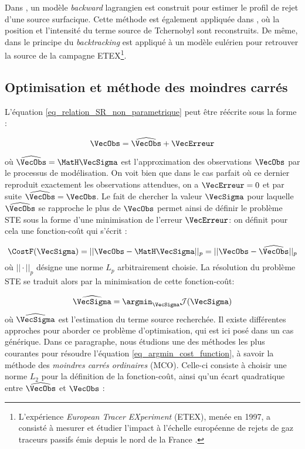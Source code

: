 Dans \cite{Flesch1995}, un modèle \textit{backward} lagrangien est construit pour estimer le profil de rejet d'une source surfacique.  Cette méthode est également appliquée dans \cite{Pudykiewicz1998}, où la position et l'intensité du terme source de Tchernobyl sont reconstruits. De même, dans \cite{Hourdin2006b} le principe du \textit{backtracking} est appliqué à un modèle eulérien pour retrouver la source de la campagne ETEX\footnote{L’expérience \textit{European Tracer EXperiment} (ETEX), menée en 1997,  a consisté à mesurer et étudier l'impact à l'échelle européenne de rejets de gaz traceurs passifs émis depuis le nord de la France \cite{Nodop1998}.}.\\
 
 \subsection{Optimisation et méthode des moindres carrés}
 \label{subsection_MCO}
 
 L'équation \eqref{eq_relation_SR_non_parametrique} peut être réécrite sous la forme : 
 
 \begin{equation}
 \VecObs = \widehat{\VecObs} + \VecErreur
 \label{eq_relation_SR_nonparam_simple}
 \end{equation}

où $\widehat{\VecObs} = \MatH \VecSigma$ est l'approximation des observations $\VecObs$ par le processus de modélisation. On voit bien que dans le cas parfait où ce dernier reproduit exactement les observations attendues, on a $\VecErreur = 0$ et par suite $\widehat{\VecObs} = \VecObs$. Le fait de chercher la valeur $\VecSigma$ pour laquelle $\widehat{\VecObs}$ se rapproche le plus de $\VecObs$ permet ainsi de définir le problème STE sous la forme d'une minimisation de l'erreur $\VecErreur$: on définit pour cela une fonction-coût qui s'écrit : 

\begin{equation}
\CostF(\VecSigma) = ||\VecObs - \MatH \VecSigma||_p = ||\VecObs- \widehat{\VecObs}||_p
\label{eq_cost_function_definition}
\end{equation}
où $||\cdot||_p$ désigne une norme $L_p$ arbitrairement choisie. La résolution du problème STE se traduit alors par la minimisation de cette fonction-coût:

\begin{equation}
\widehat{\VecSigma} = \argmin_\VecSigma \mathcal{J}(\VecSigma)
\label{eq_argmin_cost_function}
\end{equation}
où $\widehat{\VecSigma}$ est l'estimation du terme source recherchée. Il existe différentes approches  pour aborder ce problème d'optimisation, qui est ici posé dans un cas générique. Dans ce paragraphe, nous étudions une des méthodes les plus courantes pour résoudre l'équation \eqref{eq_argmin_cost_function}, à savoir la méthode des \textit{moindres carrés ordinaires} (MCO). Celle-ci consiste à choisir une norme $L_2$ pour la définition de la fonction-coût, ainsi qu'un écart quadratique entre $\widehat{\VecObs}$ et $\VecObs$ : 


